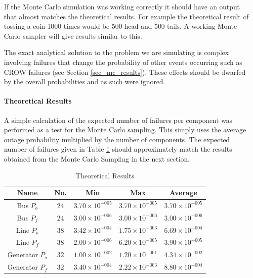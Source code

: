 \documentclass[a4paper,oneside,12pt]{report}
\begin{document}
If the Monte Carlo simulation was working correctly it should have an
output that almost matches the theoretical results. For example the
theoretical result of tossing a coin 1000 times would be 500 head and
500 tails. A working Monte Carlo sampler will give results
similar to this.

The exact analytical solution to the problem we are simulating is
complex involving failures that change the probability of other events
occurring such as CROW failures (see Section \ref{sec_mc_results}). These effects should be dwarfed by the overall
probabilities and as such were ignored.

\paragraph{Theoretical Results}

A simple calculation of the expected number of failures per component was performed as a test for the Monte Carlo sampling. This simply uses the average outage probability multiplied by the number of components. The expected number of failures given in Table \ref{table_theo} should approximately match the results obtained from the Monte Carlo Sampling in the next section.

\begin{table}[!t]
\renewcommand{\arraystretch}{1.3}
\caption{Theoretical Results}
\label{table_theo}
\centering
\begin{tabular}{c||c||c||c||c}
\bfseries Name & \bfseries No. & \bfseries Min & \bfseries Max & \bfseries Average\\
\hline\hline
Bus $P_o$	& $24$ & $3.70 \times 10^{-005}$ & $3.70 \times 10^{-005}$ & $3.70 \times 10^{-005}$ \\
Bus $P_f$	& $24$ & $3.00 \times 10^{-006}$ & $3.00 \times 10^{-006}$ & $3.00 \times 10^{-006}$ \\
Line $P_o$	& $38$ & $3.42 \times 10^{-004}$ & $1.75 \times 10^{-003}$ & $6.69 \times 10^{-004}$ \\
Line $P_f$	& $38$ & $2.00 \times 10^{-006}$ & $6.20 \times 10^{-005}$ & $3.90 \times 10^{-005}$	 \\
Generator $P_o$ & $32$ & $1.00 \times 10^{-002}$ & $1.20 \times 10^{-001}$ & $4.34 \times 10^{-002}$ \\
Generator $P_f$ & $32$ & $3.40 \times 10^{-004}$ & $2.22 \times 10^{-003}$ & $8.80 \times 10^{-004}$ \\
\hline
\end{tabular}
\end{table}
\end{document}
